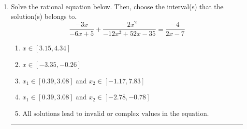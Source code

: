 \documentclass[14pt]{extbook}
\newcommand{\litem}[1]{\item#1\hspace*{-1cm}\rule{\textwidth}{0.4pt}}
\begin{document}
\begin{enumerate}
{\begin{enumerate}[label=\Alph*.]
\end{enumerate} }
\litem{
Solve the rational equation below. Then, choose the interval(s) that the solution(s) belongs to.\[ \frac{-3x}{-6x + 5} + \frac{-2x^{2}}{-12x^{2} +52 x -35} = \frac{-4}{2x -7} \]\begin{enumerate}[label=\Alph*.]
\item \( x \in [3.15,4.34] \)
\item \( x \in [-3.35,-0.26] \)
\item \( x_1 \in [0.39, 3.08] \text{ and } x_2 \in [-1.17,7.83] \)
\item \( x_1 \in [0.39, 3.08] \text{ and } x_2 \in [-2.78,-0.78] \)
\item \( \text{All solutions lead to invalid or complex values in the equation.} \)

\end{enumerate} }
\end{enumerate}
\end{document}
